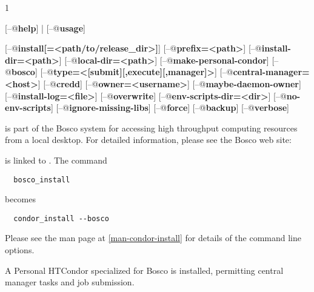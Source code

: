 \begin{ManPage}{\label{man-bosco-install}}{1}
{ }


\Synopsis {}
[\verb@--@\textbf{help}] | [\verb@--@\textbf{usage}]

[\verb@--@\textbf{install[=<path/to/release\_dir>]}]
[\verb@--@\textbf{prefix=<path>}]
[\verb@--@\textbf{install-dir=<path>}]
[\verb@--@\textbf{local-dir=<path>}]
[\verb@--@\textbf{make-personal-condor}]
[\verb@--@\textbf{bosco}]
[\verb@--@\textbf{type=<[submit][,execute][,manager]>}]
[\verb@--@\textbf{central-manager=<host>}]
[\verb@--@\textbf{credd}]
[\verb@--@\textbf{owner=<username>}]
[\verb@--@\textbf{maybe-daemon-owner}]
[\verb@--@\textbf{install-log=<file>}]
[\verb@--@\textbf{overwrite}]
[\verb@--@\textbf{env-scripts-dir=<dir>}]
[\verb@--@\textbf{no-env-scripts}]
[\verb@--@\textbf{ignore-missing-libs}]
[\verb@--@\textbf{force}]
[\verb@--@\textbf{backup}]
[\verb@--@\textbf{verbose}]

\Description

 is part of the Bosco system for accessing high
throughput computing resources from a local desktop.
For detailed information, please see the Bosco web site:

 is linked to .
The command
\begin{verbatim}
  bosco_install
\end{verbatim}
becomes
\begin{verbatim}
  condor_install --bosco
\end{verbatim}
Please see the  man page at \ref{man-condor-install}
for details of the command line options.

A Personal HTCondor specialized for Bosco is installed,
permitting central manager tasks and job submission. 


\end{ManPage}
